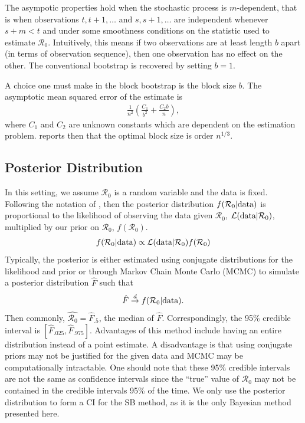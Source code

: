 \documentclass[12pt]{article}
\newcommand{\rr}{\ensuremath{\mathcal{R}_0}}
\begin{document}
The asympotic properties hold when the stochastic process is $m$-dependent, that is when observations $t, t+1, \dots$ and $s, s+1, \dots$ are independent whenever $s+m < t$ and under some smoothness conditions on the statistic used to estimate $\rr$.  Intuitively, this means if two observations are at least length $b$ apart (in terms of observation sequence), then one observation has no effect on the other. The conventional bootstrap is recovered by setting $b=1$.

A choice one must make in the block bootstrap is the block size $b$.  The asymptotic mean squared error of the estimate is
\begin{align*}
\frac{1}{n^2} \left (\frac{C_1}{b^2} + \frac{C_2b}{n} \right ),
\end{align*}
where $C_1$ and $C_2$ are unknown constants which are dependent on the estimation problem.  \cite{cao1999} reports then that the optimal block size is order $n^{1/3}$.


\subsection{Posterior Distribution}
In this setting, we assume $\rr$ is a random variable and the data is fixed.  Following the notation of \cite{wasserman2004}, then the posterior distribution $f(\rr | \textnormal{data})$ is proportional to the likelihood of observing the data given $\rr$, $\mathcal{L}(\textnormal{data}|\rr)$, multiplied by our prior on $\rr$, $f(\rr)$. 
\begin{align*}
f(\rr | \textnormal{data} ) \propto \mathcal{L}(\textnormal{data} | \rr) f(\rr)
\end{align*}
 Typically, the posterior is either estimated using conjugate distributions for the likelihood and prior or through Markov Chain Monte Carlo (MCMC) to simulate a posterior distribution $\hat{F}$ such that
\begin{align*}
\hat{F} \overset{d}{\to} f(\rr| \textnormal{data}).
\end{align*}
Then commonly, $\hat{\rr} = \hat{F}_{.5}$, the median of $\hat{F}$.  Correspondingly, the 95\% credible interval is $\left[\hat{F}_{.025}, \hat{F}_{.975} \right ]$. Advantages of this method include having an entire distribution instead of a point estimate.  A disadvantage is that using conjugate priors may not be justified for the given data and MCMC may be computationally intractable.  One should note that these 95\% credible intervals are not the same as confidence intervals since the ``true'' value of $\rr$ may not be contained in the credible intervals 95\% of the time.  We only use the posterior distribution to form a CI for the SB method, as it is the only Bayesian method presented here.
\end{document}
